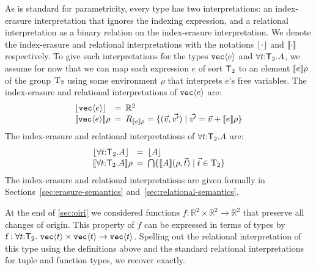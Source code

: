 As is standard for parametricity, every type has two interpretations:
an index-erasure interpretation that ignores the indexing expression,
and a relational interpretation as a binary relation on the
index-erasure interpretation. We denote the index-erasure and
relational interpretations with the notations $\left\lfloor \cdot \right\rfloor$ and
$\llbracket \cdot \rrbracket{}$ respectively. To give such interpretations for the
types $\textup{\texttt{vec}}\langle e \rangle$ and $\forall t\mathord:\mathsf{T}_2.A$, we
assume for now that we can map each expression $e$ of sort
$\mathsf{T}_2$ to an element $\llbracket e \rrbracket\rho$ of the group $\mathrm{T}_2$
using some environment $\rho$ that interprets $e$'s free
variables. The index-erasure and relational interpretations of
$\textup{\texttt{vec}}\langle e \rangle$ are:
\begin{displaymath}
  \begin{array}{l@{\hspace{0.5em}=\hspace{0.5em}}l}
    \tySem{\tyPrim{vec}{e}} & \mathbb{R}^2
    \\ \rsem{\tyPrim{vec}{e}}{}\rho & R_{\sem{e}\rho} = \{
    (\vec{v},\vec{v'}) \sepbar \vec{v'} = \vec{v} + \sem{e}\rho \}
  \end{array}
\end{displaymath}
The index-erasure and relational interpretations of 
$\forall t\mathord:\mathsf{T}_2.A$ are:
\begin{displaymath}
  \begin{array}{l@{\hspace{0.5em}=\hspace{0.5em}}l}
    \tySem{\forall t\mathord:\SynTransl{2}.A} & \tySem{A}
    \\ \rsem{\forall t\mathord:\SynTransl{2}.A}{}\rho & \bigcap\{
    \rsem{A}{}{(\rho,\vec{t})} \sepbar \vec{t} \in \Transl{2} \}
  \end{array}
\end{displaymath}
The index-erasure and relational interpretations are given
formally in Sections~\ref{sec:erasure-semantics}
and~\ref{sec:relational-semantics}. %

At the end of \autoref{sec:oiri} we considered functions $f :
\mathbb{R}^2 \times \mathbb{R}^2 \to \mathbb{R}^2$ that preserve all
changes of origin. This property of $f$ can be expressed in terms of
types by
$  \mathrm{f} : \forall t \mathord: \SynTransl{2}.\ \tyPrim{vec}{t}
  \times \tyPrim{vec}{t} \to \tyPrim{vec}{t}$.
Spelling out the relational interpretation of this type using the
definitions above and the standard relational interpretations for
tuple and function types, we recover
 exactly.

